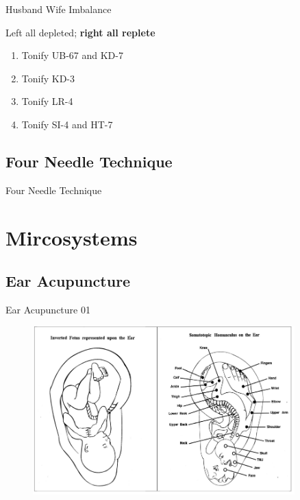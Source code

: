 \begin{frame}{Husband Wife Imbalance}

\begin{pulse}
Left all depleted; \textbf{right all replete}
\end{pulse}

\begin{enumerate}
\item Tonify UB-67 and KD-7
\item Tonify KD-3
\item Tonify LR-4
\item Tonify SI-4 and HT-7
\end{enumerate}

\end{frame}

\subsection{Four Needle Technique}

\begin{frame}{Four Needle Technique}

\end{frame}


\section{Mircosystems}

\subsection{Ear Acupuncture}

\begin{frame}{Ear Acupuncture 01}
  \begin{figure}
    \centering
    \includegraphics[width=0.9\textwidth]{img/ear.png}
  \end{figure}

\end{frame}

